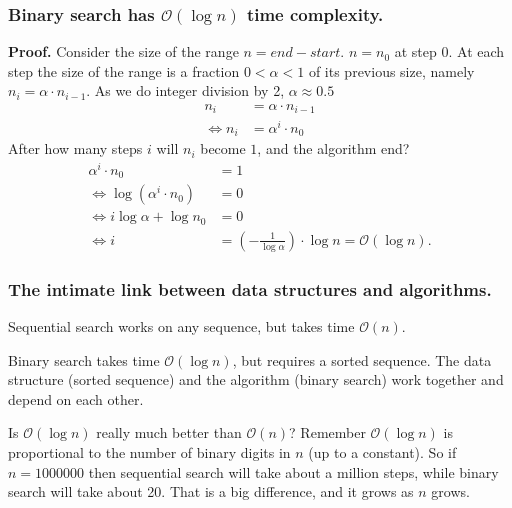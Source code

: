 \documentclass{beamer} %
\begin{document}

\begin{frame}
\frametitle{Binary search has $\mathcal{O}(\log n)$ time complexity.}

\textbf{Proof.} Consider the size of the range $n = end - start$.  $n = n_0$ at step 0. At each step the size of the range is a fraction $0 < \alpha < 1$ of its previous size, namely $n_i = \alpha \cdot n_{i-1}$.  As we do integer division by 2, $\alpha \approx 0.5$
\begin{align}
  n_i &= \alpha \cdot n_{i-1} \\
  \Leftrightarrow n_i &= \alpha^i \cdot n_{0}
\end{align}
After how many steps $i$ will $n_i$ become $1$, and the algorithm end?
\begin{align}
  \alpha^i \cdot n_{0} &= 1 \\
  \Leftrightarrow \log (\alpha^i \cdot n_{0}) &= 0 \\
\Leftrightarrow i \log \alpha + \log n_{0} &= 0 \\
\Leftrightarrow i &= \left( - \frac{1}{\log \alpha} \right) \cdot \log n = \mathcal{O}(\log n).
\end{align}

\end{frame}


\begin{frame}
\frametitle{The intimate link between data structures and algorithms.}

Sequential search works on any sequence, but takes time $\mathcal{O}(n)$.

\vspace{5mm}
Binary search takes time $\mathcal{O}(\log n)$, but requires a sorted sequence. The data structure (sorted sequence) and the algorithm (binary search) work together and depend on each other.

\vspace{5mm}
\begin{block}{Is $\mathcal{O}(\log n)$ really much better than $\mathcal{O}(n)$?}
Remember $\mathcal{O}(\log n)$ is proportional to the number of binary digits in $n$ (up to a constant). So if $n=1000000$ then sequential search will take about a million steps, while binary search will take about 20. That is a big difference, and it grows as $n$ grows.
\end{block}

\end{frame}
\end{document}
